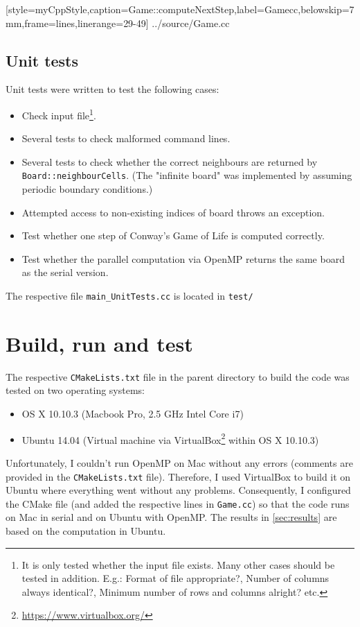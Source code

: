 
[style=myCppStyle,caption={Game::computeNextStep},label=Gamecc,belowskip=7mm,frame=lines,linerange={29-49}]
{../source/Game.cc}

\subsection{Unit tests}
Unit tests were written to test the following cases:
\begin{itemize}
	\item Check input file\footnote{It is only tested whether the input file exists. Many other cases should be tested in addition. E.g.: Format of file appropriate?, Number of columns always identical?, Minimum number of rows and columns alright? etc.}.
	\item Several tests to check malformed command lines.
	\item Several tests to check whether the correct neighbours are returned by \texttt{Board::neighbourCells}. (The "infinite board" was implemented by assuming periodic boundary conditions.)
	\item Attempted access to non-existing indices of board throws an exception.
	\item Test whether one step of Conway's Game of Life is computed correctly.
	\item Test whether the parallel computation via OpenMP returns the same board as the serial version.
	
\end{itemize}
The respective file \texttt{main\_UnitTests.cc} is located in \texttt{test/}

\section{Build, run and test}\label{sec:BuildRunTest}
The respective \texttt{CMakeLists.txt} file in the parent directory to build the code was tested on two operating systems:

\begin{itemize}
	\item OS X 10.10.3 (Macbook Pro, 2.5 GHz Intel Core i7)
	\item Ubuntu 14.04 (Virtual machine via VirtualBox\footnote{\url{https://www.virtualbox.org/}} within OS X 10.10.3)
\end{itemize}

Unfortunately, I couldn't run OpenMP on Mac without any errors (comments are provided in the \texttt{CMakeLists.txt} file). Therefore, I used VirtualBox to build it on Ubuntu where everything went without any problems. Consequently, I configured the CMake file (and added the respective lines in \texttt{Game.cc}) so that the code runs on Mac in serial and on Ubuntu with OpenMP. The results in \cref{sec:results} are based on the computation in Ubuntu.


